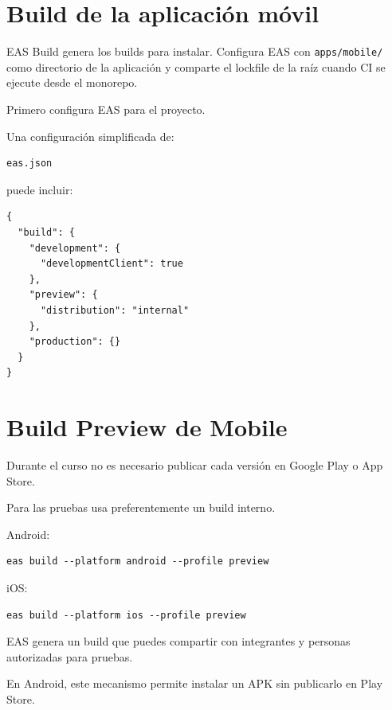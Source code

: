 \documentclass[11pt,a4paper]{article}
\begin{document}
\section{Build de la aplicación móvil}

EAS Build genera los builds para instalar. Configura EAS con
\texttt{apps/mobile/}
como directorio de la aplicación y comparte el lockfile de la raíz cuando CI se
ejecute desde el monorepo.

Primero configura EAS para el proyecto.

Una configuración simplificada de:

\begin{lstlisting}
eas.json
\end{lstlisting}

puede incluir:

\begin{lstlisting}
{
  "build": {
    "development": {
      "developmentClient": true
    },
    "preview": {
      "distribution": "internal"
    },
    "production": {}
  }
}
\end{lstlisting}

\section{Build Preview de Mobile}

Durante el curso no es necesario publicar cada versión en Google Play o App
Store.

Para las pruebas usa preferentemente un build interno.

Android:

\begin{lstlisting}
eas build --platform android --profile preview
\end{lstlisting}

iOS:

\begin{lstlisting}
eas build --platform ios --profile preview
\end{lstlisting}

EAS genera un build que puedes compartir con integrantes y personas autorizadas
para pruebas.

En Android, este mecanismo permite instalar un APK sin publicarlo en Play Store.

\end{document}
